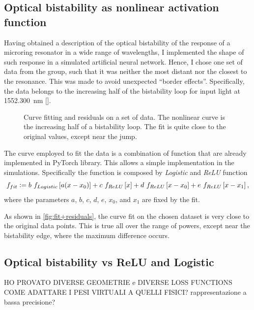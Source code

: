 \subsection{Optical bistability as nonlinear activation function}
\label{ssec:Optical_bistability_as_nonlinear_activation_function}
Having obtained a description of the optical bistability of the response of a microring resonator in a wide range of wavelengths, I implemented the shape of such response in a simulated artificial neural network.
Hence, I chose one set of data from the group, such that it was neither the most distant nor the closest to the resonance.
This was made to avoid unexpected ``border effects''.
Specifically, the data belongs to the increasing half of the bistability loop for input light at \SI{1552.300}{\nm} \ref{}.

\begin{figure}[htbp]
	\centering
	
	\caption{Curve fitting and residuals on a set of data.
	The nonlinear curve is the increasing half of a bistability loop.
	The fit is quite close to the original values, except near the jump.}
	\label{fig:fit+residuals}
\end{figure}

The curve employed to fit the data is a combination of function that are already implemented in PyTorch library.
This allows a simple implementation in the simulations.
Specifically the function is composed by \textit{Logistic} and \textit{ReLU} function
\begin{equation}
	f_{fit} \vcentcolon= b~f_{Logistic}\left[a(x-x_0)\right] + c~f_{ReLU}\left[x\right]+d~f_{ReLU}\left[x-x_0\right]+e~f_{ReLU}\left[x-x_1\right],
	\label{eq:fit}
\end{equation}
where the parameters $a$, $b$, $c$, $d$, $e$, $x_0$, and $x_1$ are fixed by the fit.

As shown in \autoref{fig:fit+residuals}, the curve fit on the chosen dataset is very close to the original data points.
This is true all over the range of powers, except near the bistability edge, where the maximum difference occurs.

\subsection{Optical bistability vs ReLU and Logistic}
\label{ssec:OBvsReLUvsSIGM}
HO PROVATO DIVERSE GEOMETRIE e DIVERSE LOSS FUNCTIONS\\
COME ADATTARE I PESI VIRTUALI A QUELLI FISICI? rappresentazione a bassa precisione?

